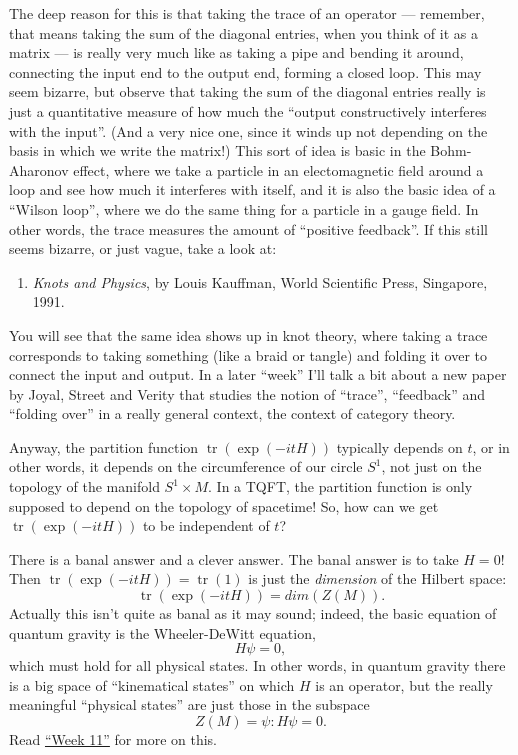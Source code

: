 \documentclass{article}
\def\tightlist{}
\begin{document}
The deep reason for this is that taking the trace of an operator ---
remember, that means taking the sum of the diagonal entries, when you
think of it as a matrix --- is really very much like as taking a pipe
and bending it around, connecting the input end to the output end,
forming a closed loop. This may seem bizarre, but observe that taking
the sum of the diagonal entries really is just a quantitative measure of
how much the ``output constructively interferes with the input''. (And a
very nice one, since it winds up not depending on the basis in which we
write the matrix!) This sort of idea is basic in the Bohm-Aharonov
effect, where we take a particle in an electomagnetic field around a
loop and see how much it interferes with itself, and it is also the
basic idea of a ``Wilson loop'', where we do the same thing for a
particle in a gauge field. In other words, the trace measures the amount
of ``positive feedback''. If this still seems bizarre, or just vague,
take a look at:

\begin{enumerate}
\def\labelenumi{\arabic{enumi})}
\setcounter{enumi}{3}
\tightlist
\item
  \emph{Knots and Physics}, by Louis Kauffman, World Scientific Press,
  Singapore, 1991.
\end{enumerate}

You will see that the same idea shows up in knot theory, where taking a
trace corresponds to taking something (like a braid or tangle) and
folding it over to connect the input and output. In a later ``week''
I'll talk a bit about a new paper by Joyal, Street and Verity that
studies the notion of ``trace'', ``feedback'' and ``folding over'' in a
really general context, the context of category theory.

Anyway, the partition function \(\operatorname{tr}(\exp(-itH))\)
typically depends on \(t\), or in other words, it depends on the
circumference of our circle \(S^1\), not just on the topology of the
manifold \(S^1\times M\). In a TQFT, the partition function is only
supposed to depend on the topology of spacetime! So, how can we get
\(\operatorname{tr}(\exp(-itH))\) to be independent of \(t\)?

There is a banal answer and a clever answer. The banal answer is to take
\(H = 0\)! Then \(\operatorname{tr}(\exp(-itH)) = \operatorname{tr}(1)\)
is just the \emph{dimension} of the Hilbert space:
\[\operatorname{tr}(\exp(-itH)) = dim(Z(M)).\] Actually this isn't quite
as banal as it may sound; indeed, the basic equation of quantum gravity
is the Wheeler-DeWitt equation, \[H \psi = 0,\] which must hold for all
physical states. In other words, in quantum gravity there is a big space
of ``kinematical states'' on which \(H\) is an operator, but the really
meaningful ``physical states'' are just those in the subspace
\[Z(M) = {\psi: H \psi = 0}.\] Read \protect\hyperlink{week11}{``Week
11''} for more on this.
\end{document}
